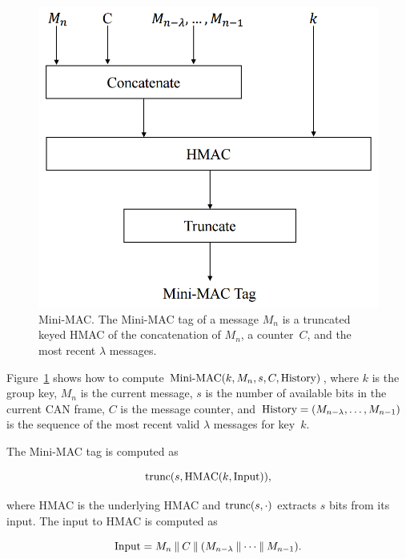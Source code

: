 	\begin{figure}
		\centering
		\includegraphics[width=\columnwidth]{figures/minimac_diagram.png}
		\caption{Mini-MAC. The Mini-MAC tag of a message $M_n$ is a truncated keyed HMAC of 
		the concatenation of $M_n$, a counter~$C$, and the most recent $\lambda$ messages.}
		\label{fig-minimac}
	\end{figure}

Figure~\ref{fig-minimac} shows how to compute 
$\hbox{Mini-MAC}(k,M_n,s,C,\hbox{History})$, 
where $k$ is the group key, 
$M_n$ is the current message, 
$s$ is the number of available bits in the current CAN frame, 
$C$ is the message counter, 
and $\hbox{History} = (M_{n-{\lambda}}, \ldots, M_{n-1})$ 
is the sequence of the most recent
valid $\lambda$ messages for key~$k$.

The Mini-MAC tag is computed as

\begin{equation}
\hbox{trunc(}s,\text{HMAC}(k,\text{Input})),
\end{equation}

\noindent where HMAC is the underlying HMAC and $\hbox{trunc}(s,\cdot)$
extracts $s$ bits from its input.  The input to HMAC is computed as

\begin{equation}
\text{Input} = M_n \mathbin{\|} C \mathbin{\|} (M_{n-{\lambda}} \mathbin{\|} \cdots \mathbin{\|} M_{n-1}) .
\end{equation}

